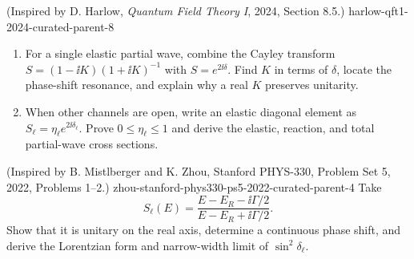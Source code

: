 \begin{enumerate}
  {(Inspired by D. Harlow, \emph{Quantum Field Theory I}, 2024, Section 8.5.)}
  {harlow-qft1-2024-curated-parent-8}
\begin{enumerate}
\item
For a single elastic partial wave, combine the Cayley transform
\(S=(1-\ii K)(1+\ii K)^{-1}\) with \(S=e^{2\ii\delta}\).  Find \(K\) in terms of
\(\delta\), locate the phase-shift resonance, and explain why a real
\(K\) preserves unitarity.
\item
When other channels are open, write an elastic diagonal element as
\(S_\ell=\eta_\ell e^{2\ii\delta_\ell}\).  Prove
\(0\leq\eta_\ell\leq1\) and derive the elastic, reaction, and total
partial-wave cross sections.
\end{enumerate}

  {(Inspired by B. Mistlberger and K. Zhou, Stanford PHYS-330, Problem Set 5, 2022, Problems 1--2.)}
  {zhou-stanford-phys330-ps5-2022-curated-parent-4}
Take
\[
 S_\ell(E)=\frac{E-E_R-\ii\Gamma/2}{E-E_R+\ii\Gamma/2}.
\]
Show that it is unitary on the real axis, determine a continuous
phase shift, and derive the Lorentzian form and narrow-width limit of
\(\sin^2\delta_\ell\).
\end{enumerate}
